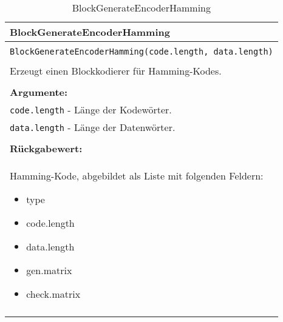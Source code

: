 \begin{longtable}{|p{\textwidth}|}
\hline
\rowcolor{lightblue}
BlockGenerateEncoderHamming
\\
\hline
\\
\texttt{BlockGenerateEncoderHamming(code.length, data.length)}\\
\\
Erzeugt einen Blockkodierer für Hamming-Kodes.\\
\\
\textbf{Argumente:}\\
\texttt{code.length} - Länge der Kodewörter.\\
\texttt{data.length} - Länge der Datenwörter.\\
\\
\textbf{Rückgabewert:}\\
Hamming-Kode, abgebildet als Liste mit folgenden Feldern:
\vspace{4mm}
\begin{itemize}
\renewcommand\labelitemi{--}
\itemsep-.5em %
\item type
\item code.length
\item data.length
\item gen.matrix
\item check.matrix 
\end{itemize}
\\
\hline
\caption{BlockGenerateEncoderHamming}
\end{longtable}